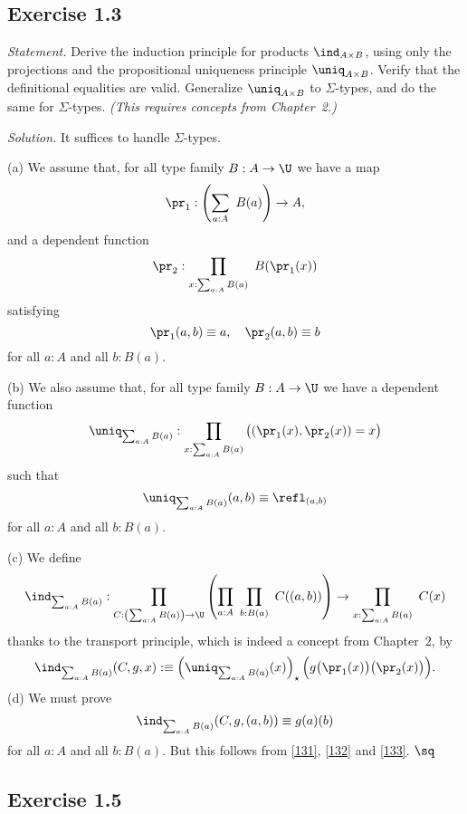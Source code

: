 \documentclass[12pt]{article}
\begin{document}
%

\subsection{Exercise 1.3} 

\emph{Statement.} Derive the induction principle for products $\ind_{A\times B}$, using only the projections and the propositional uniqueness principle $\uniq_{A\times B}$. Verify that the definitional equalities are valid. Generalize $\uniq_{A\times B}$ to $\Sigma$-types, and do the same for $\Sigma$-types. \emph{(This requires concepts from Chapter~2.)}

\nn\emph{Solution.} It suffices to handle $\Sigma$-types. 

\nn(a) We assume that, for all type family $B:A\to\U$ we have a map 
$$
\pr_1:\left(\sum_{a:A}\ B(a)\right)\to A,
$$ 
and a dependent function 
$$
\pr_2:\prod_{x:\sum_{a:A}B(a)}\ B(\pr_1(x))
$$
satisfying
\begin{equation}\label{131}
\pr_1(a,b)\equiv a,\quad\pr_2(a,b)\equiv b
\end{equation}
for all $a:A$ and all $b:B(a)$.

\nn(b) We also assume that, for all type family $B:A\to\U$ we have a dependent function 
$$
\uniq_{\sum_{a:A}B(a)}:\prod_{x:\sum_{a:A}B(a)}\big((\pr_1(x),\pr_2(x))=x\big)
$$ 
such that 
\begin{equation}\label{132}
\uniq_{\sum_{a:A}B(a)}(a,b)\equiv\refl_{(a,b)}
\end{equation}
for all $a:A$ and all $b:B(a)$. 

\nn(c) We define
$$
\ind_{\sum_{a:A}B(a)}:\prod_{C:\left(\sum_{a:A}B(a)\right)\to\U} 
\left(\prod_{a:A}\ \prod_{b:B(a)}\ C((a,b))\right) 
\to\prod_{x:\sum_{a:A}B(a)}\ C(x)
$$
thanks to the transport principle, which is indeed a concept from Chapter~2, by
\begin{equation}\label{133}
\ind_{\sum_{a:A}B(a)}(C,g,x):\equiv\left(\uniq_{\sum_{a:A}B(a)}(x)\right)_\star\Big(g\big(\pr_1(x)\big)\big(\pr_2(x)\big)\Big).
\end{equation}
(d) We must prove 
$$
\ind_{\sum_{a:A}B(a)}(C,g,(a,b))\equiv g(a)(b)
$$
for all $a:A$ and all $b:B(a)$. But this follows from \eqref{131}, \eqref{132} and \eqref{133}. $\sq$


\subsection{Exercise 1.5}
\end{document}
